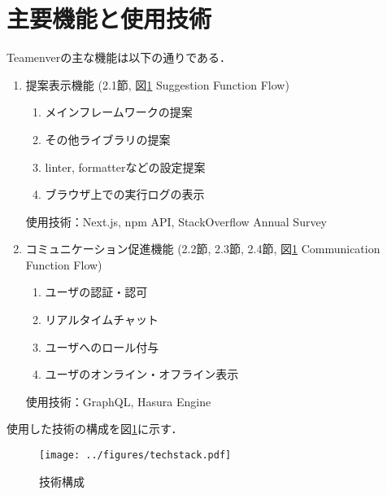 \documentclass[main]{subfiles}
\begin{document}
\section{主要機能と使用技術}
Teamenverの主な機能は以下の通りである．

\begin{enumerate}
\item 提案表示機能 (2.1節, 図\ref{fig:techstack} Suggestion Function Flow)
\begin{enumerate}
\item メインフレームワークの提案
\item その他ライブラリの提案
\item linter, formatterなどの設定提案
\item ブラウザ上での実行ログの表示
\end{enumerate}
使用技術：Next.js, npm API\cite{npm}, StackOverflow Annual Survey\cite{stackoverflow}

\item コミュニケーション促進機能 (2.2節, 2.3節, 2.4節, 図\ref{fig:techstack} Communication Function Flow)
\begin{enumerate}
\item ユーザの認証・認可
\item リアルタイムチャット
\item ユーザへのロール付与
\item ユーザのオンライン・オフライン表示
\end{enumerate}
使用技術：GraphQL, Hasura Engine
\end{enumerate}
使用した技術の構成を図\ref{fig:techstack}に示す．
\begin{figure}[h]
    \centering
    \texttt{[image: ../figures/techstack.pdf]}
    \caption{技術構成}
    \label{fig:techstack}
\end{figure}
\end{document}
